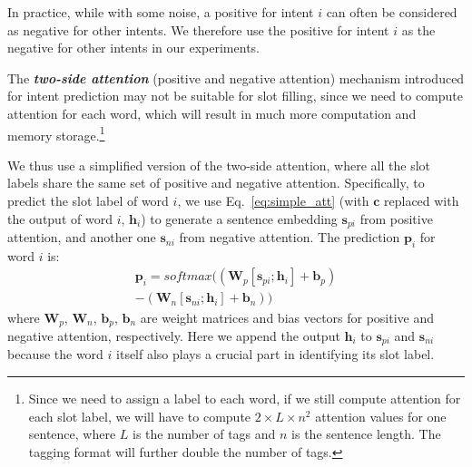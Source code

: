 In practice, while with some noise, a positive \RE for intent $i$ can often be considered as negative \REs for other intents.
We therefore use the positive \REs for intent $i$ as the negative \REs for other intents in our experiments.

The \textbf{\emph{two-side attention}} (positive and negative attention) mechanism introduced for intent prediction
may not be suitable for slot filling, since we need to compute attention for each word, which will result in much more
computation and memory storage.\footnote{Since we need to assign a label to each word, if we still compute attention for each slot label, we
will have to compute $2\times L \times n^2$ attention values for one sentence, where $L$ is the number of tags and $n$ is the sentence
length. The \BIO tagging format will further double the number of tags.}

We thus use a simplified version of the two-side attention, where all the slot labels share the same set of positive and negative attention.
Specifically, to predict the slot label of word $i$, we use Eq.~\ref{eq:simple_att} (with $\textbf{c}$ replaced with the \BLSTM output of word $i$, $\textbf{h}_i$) to generate a sentence embedding $\textbf{s}_{pi}$ from positive attention, and another one $\textbf{s}_{ni}$ from negative attention.
The prediction $\textbf{p}_i$ for word $i$ is:
\begin{equation}
\begin{split}
\textbf{p}_i = softmax((\textbf{W}_p [\textbf{s}_{pi}; \textbf{h}_i] + \textbf{b}_p) \\- (\textbf{W}_n [\textbf{s}_{ni}; \textbf{h}_i] + \textbf{b}_n))
\end{split}
\end{equation}
where $\textbf{W}_{p}$, $\textbf{W}_{n}$, $\textbf{b}_{p}$, $\textbf{b}_{n}$ are weight matrices and bias vectors for positive and negative attention, respectively. Here we append the \BLSTM output $\textbf{h}_i$ to $\textbf{s}_{pi}$ and $\textbf{s}_{ni}$ because the word $i$ itself also plays a crucial part in identifying its slot label.

